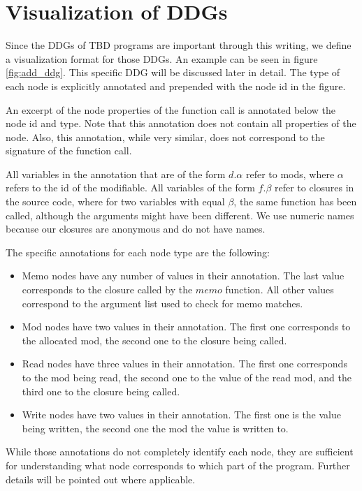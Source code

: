 \section{Visualization of DDGs}

Since the DDGs of TBD programs are important through this writing, we define a visualization format for those DDGs. An example can be seen in figure \ref{fig:add_ddg}. This specific DDG will be discussed later in detail. The type of each node is explicitly annotated and prepended with the node id in the figure. 

An excerpt of the node properties of the function call is annotated below the node id and type. Note that this annotation does not contain all properties of the node. Also, this annotation, while very similar, does not correspond to the signature of the function call. 

All variables in the annotation that are of the form $d.\alpha$ refer to mods, where $\alpha$ refers to the id of the modifiable. All variables of the form $f.\beta$ refer to closures in the source code, where for two variables with equal $\beta$, the same function has been called, although the arguments might have been different. We use numeric names because our closures are anonymous and do not have names. 

The specific annotations for each node type are the following:
\begin{itemize}
\item Memo nodes have any number of values in their annotation. The last value corresponds to the closure called by the $memo$ function. All other values correspond to the argument list used to check for memo matches. 

\item Mod nodes have two values in their annotation. The first one corresponds to the allocated mod, the second one to the closure being called. 

\item Read nodes have three values in their annotation. The first one corresponds to the mod being read, the second one to the value of the read mod, and the third one to the closure being called.

\item Write nodes have two values in their annotation. The first one is the value being written, the second one the mod the value is written to. 
\end{itemize}

While those annotations do not completely identify each node, they are sufficient for understanding what node corresponds to which part of the program. Further details will be pointed out where applicable.   

